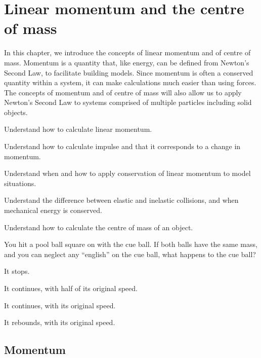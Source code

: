 
\chapter{Linear momentum and the centre of mass}
\label{chapter:momentumandcm}
In this chapter, we introduce the concepts of linear momentum and of centre of mass. Momentum is a quantity that, like energy, can be defined from Newton's Second Law, to facilitate building models. Since momentum is often a conserved quantity within a system, it can make calculations much easier than using forces. The concepts of momentum and of centre of mass will also allow us to apply Newton's Second Law to systems comprised of multiple particles including solid objects. 

\begin{learningObjectives}{
 \item Understand how to calculate linear momentum.
 \item Understand how to calculate impulse and that it corresponds to a change in momentum.
 \item Understand when and how to apply conservation of linear momentum to model situations.
 \item Understand the difference between elastic and inelastic collisions, and when mechanical energy is conserved.
 \item Understand how to calculate the centre of mass of an object.
}
\end{learningObjectives}

\begin{opening}
\begin{MCquestion}{You hit a pool ball square on with the cue ball. If both balls have the same mass, and you can neglect any ``english'' on the cue ball, what happens to the cue ball?}
\item It stops.
\item It continues, with half of its original speed.
\item It continues, with its original speed.
\item It rebounds, with its original speed.
\end{MCquestion}
\end{opening}


\section{Momentum}
